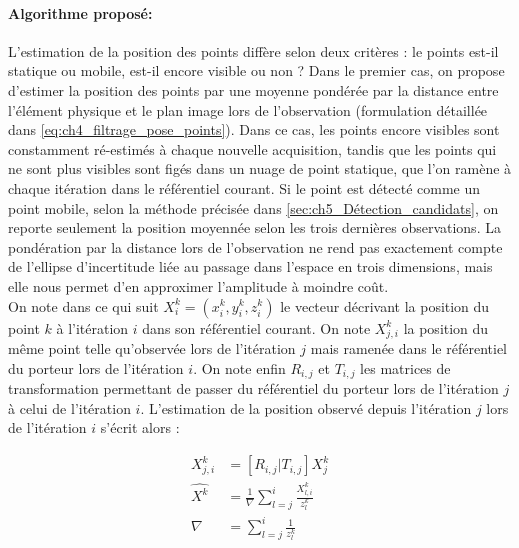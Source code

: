 \paragraph{Algorithme proposé:\\}
L'estimation de la position des points diffère selon deux critères : le points est-il statique ou mobile, est-il encore visible ou non ? Dans le premier cas, on propose d'estimer la position des points par une moyenne pondérée par la distance entre l'élément physique et le plan image lors de l'observation (formulation détaillée dans \ref{eq:ch4_filtrage_pose_points}). Dans ce cas, les points encore visibles sont constamment ré-estimés à chaque nouvelle acquisition, tandis que les points qui ne sont plus visibles sont figés dans un nuage de point statique, que l'on ramène à chaque itération dans le référentiel courant. Si le point est détecté comme un point mobile, selon la méthode précisée dans \ref{sec:ch5_Détection_candidats}, on reporte seulement la position moyennée selon les trois dernières observations. La pondération par la distance lors de l'observation ne rend pas exactement compte de l'ellipse d'incertitude liée au passage dans l'espace en trois dimensions, mais elle nous permet d'en approximer l'amplitude à moindre coût.\\

On note dans ce qui suit $X_i^k = (x_i^k, y_i^k, z_i^k)$ le vecteur décrivant la position du point $k$ à l'itération $i$ dans son référentiel courant. On note $X_{j,i}^k$ la position du même point telle qu'observée lors de l'itération $j$ mais ramenée dans le référentiel du porteur lors de l'itération $i$. On note enfin $R_{i,j}$ et $T_{i,j}$ les matrices de transformation permettant de passer du référentiel du porteur lors de l'itération $j$ à celui de l'itération $i$. L'estimation de la position observé depuis l'itération $j$ lors de l'itération $i$ s'écrit alors :

\begin{align}
	X_{j,i}^k	 	&= [R_{i,j} | T_{i,j}] X_j^k \\
	{\hat{X^k}} &= \frac{1}{\nabla} \sum\limits_{l = j}^{i} \frac{X_{l,i}^k}{z_{l}^k}  \label{eq:ch4_filtrage_pose_points}\\
	\nabla 			&= \sum\limits_{l = j}^{i} \frac{1}{z_{l}^k}
\end{align}

